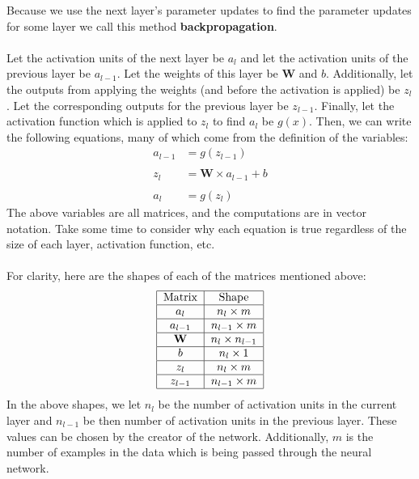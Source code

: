 \documentclass{article}
\begin{document}
\noindent Because we use the next layer's parameter updates to find the parameter updates for some layer we call this method \textbf{backpropagation}.
\\
\\
Let the activation units of the next layer be $a_l$ and let the activation units of the previous layer be $a_{l-1}$. Let the weights of this layer be \textbf{W} and $b$. Additionally, let the outputs from applying the weights (and before the activation is applied) be $z_l$. Let the corresponding outputs for the previous layer be $z_{l-1}$. Finally, let the activation function which is applied to $z_l$ to find $a_l$ be $g(x)$. Then, we can write the following equations, many of which come from the definition of the variables:
\begin{align*}
    a_{l-1} &= g(z_{l-1})\tag{1}\\\\
    z_l &= \textbf{W} \times a_{l-1} + b\tag{2}\\\\
    a_l &= g(z_l)\tag{3}
\end{align*}
The above variables are all matrices, and the computations are in vector notation. Take some time to consider why each equation is true regardless of the size of each layer, activation function, etc.
\\
\\
For clarity, here are the shapes of each of the matrices mentioned above:
\[\begin{tabular}{|c|c|}
    \hline
    Matrix & Shape \\
    \hline
    $a_l$ & $n_l \times m$ \\
    \hline
    $a_{l-1}$ & $n_{l-1} \times m$ \\
    \hline
    \textbf{W} & $n_l\times n_{l-1}$ \\
    \hline
    $b$ & $n_l\times 1$ \\
    \hline
    $z_l$ & $n_l \times m$ \\
    \hline
    $z_{l-1}$ & $n_{l-1} \times m$ \\
    \hline
\end{tabular}\]
In the above shapes, we let $n_l$ be the number of activation units in the current layer and $n_{l-1}$ be then number of activation units in the previous layer. These values can be chosen by the creator of the network. Additionally, $m$ is the number of examples in the data which is being passed through the neural network.
\\
\\
\end{document}
